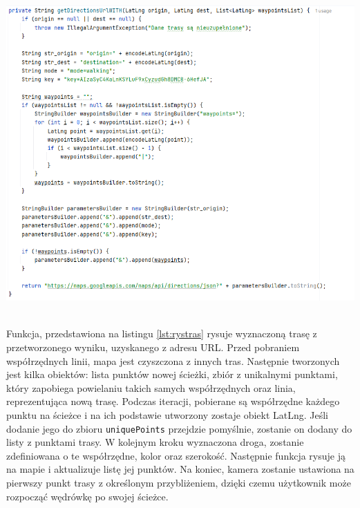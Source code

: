 \noindent
\begin{minipage}{\linewidth}
    \label{lst:trasa}
    \centering
    \includegraphics[width=0.8\linewidth]{img/kod/trasa.png}
\end{minipage}
\\

Funkcja, przedstawiona na listingu \ref{lst:rystras} rysuje wyznaczoną trasę z przetworzonego wyniku, uzyskanego z adresu URL. Przed pobraniem współrzędnych linii, mapa jest czyszczona z innych tras. Następnie tworzonych jest kilka obiektów: lista punktów nowej ścieżki, zbiór z unikalnymi punktami, który zapobiega powielaniu takich samych współrzędnych oraz linia, reprezentująca nową trasę. Podczas iteracji, pobierane są współrzędne każdego punktu na ścieżce i na ich podstawie utworzony zostaje obiekt LatLng. Jeśli dodanie jego do zbioru \verb|uniquePoints| przejdzie pomyślnie, zostanie on dodany do listy z punktami trasy. W kolejnym kroku wyznaczona droga, zostanie zdefiniowana o te współrzędne, kolor oraz szerokość. Następnie funkcja rysuje ją na mapie i aktualizuje listę jej punktów. Na koniec, kamera zostanie ustawiona na pierwszy punkt trasy z określonym przybliżeniem, dzięki czemu użytkownik może rozpocząć wędrówkę po swojej ścieżce.\\

